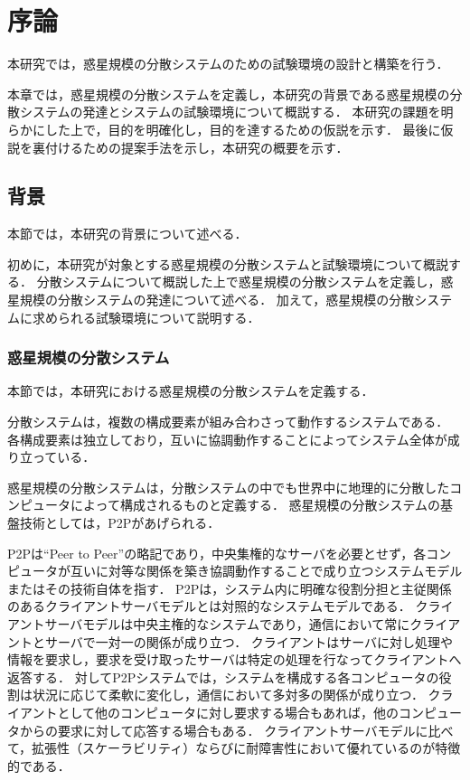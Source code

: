 \chapter{序論}
\label{introduction}

本研究では，惑星規模の分散システムのための試験環境の設計と構築を行う．

本章では，惑星規模の分散システムを定義し，本研究の背景である惑星規模の分散システムの発達とシステムの試験環境について概説する．
本研究の課題を明らかにした上で，目的を明確化し，目的を達するための仮説を示す．
最後に仮説を裏付けるための提案手法を示し，本研究の概要を示す．

\section{背景}
\label{introduction:background}

本節では，本研究の背景について述べる．

初めに，本研究が対象とする惑星規模の分散システムと試験環境について概説する．
分散システムについて概説した上で惑星規模の分散システムを定義し，惑星規模の分散システムの発達について述べる．
加えて，惑星規模の分散システムに求められる試験環境について説明する．

\subsection{惑星規模の分散システム}

本節では，本研究における惑星規模の分散システムを定義する．

分散システムは，複数の構成要素が組み合わさって動作するシステムである．
各構成要素は独立しており，互いに協調動作することによってシステム全体が成り立っている．

惑星規模の分散システムは，分散システムの中でも世界中に地理的に分散したコンピュータによって構成されるものと定義する．
惑星規模の分散システムの基盤技術としては，P2Pがあげられる．

P2Pは``Peer to Peer''の略記であり，中央集権的なサーバを必要とせず，各コンピュータが互いに対等な関係を築き協調動作することで成り立つシステムモデルまたはその技術自体を指す．
P2Pは，システム内に明確な役割分担と主従関係のあるクライアントサーバモデルとは対照的なシステムモデルである．
クライアントサーバモデルは中央主権的なシステムであり，通信において常にクライアントとサーバで一対一の関係が成り立つ．
クライアントはサーバに対し処理や情報を要求し，要求を受け取ったサーバは特定の処理を行なってクライアントへ返答する．
対してP2Pシステムでは，システムを構成する各コンピュータの役割は状況に応じて柔軟に変化し，通信において多対多の関係が成り立つ．
クライアントとして他のコンピュータに対し要求する場合もあれば，他のコンピュータからの要求に対して応答する場合もある．
クライアントサーバモデルに比べて，拡張性（スケーラビリティ）ならびに耐障害性において優れているのが特徴的である．

